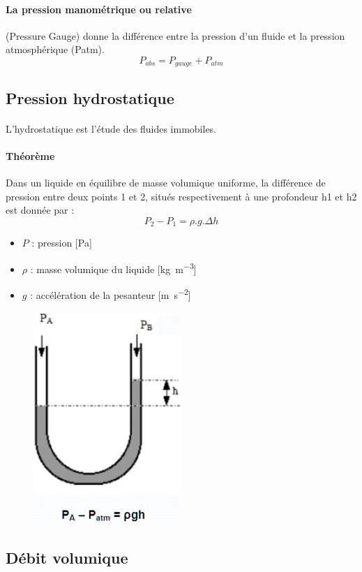 \documentclass{article}
\begin{document}
            \paragraph{La pression manométrique ou relative} (Pressure Gauge) donne la différence entre la pression d'un fluide et la pression atmosphérique (Patm).
            $$P_{abs} = P_{gauge} + P_{atm}$$

            \subsection{Pression hydrostatique}
            \paragraph{}
            L'hydrostatique est l'étude des fluides immobiles.

            \paragraph{Théorème}
            Dans un liquide en équilibre de masse volumique uniforme, la différence de pression entre deux points 1 et 2, situés respectivement à une profondeur h1 et h2 est donnée par : $$P_2 - P_1 = \rho.g.\Delta h$$

            \begin{itemize}
                \item $P$ : pression [\si{\pascal}]
                \item $\rho$ : masse volumique du liquide [\si{\kilogram \per \meter^{3}}]
                \item $g$ : accélération de la pesanteur [\si{\meter \per \second^{2}}]
            \end{itemize}
            
            \begin{figure}[H]
            \centering
                \includegraphics[width=0.2\linewidth]{./images/014-hydrostatique.png}
            \end{figure}

        \subsection{Débit volumique}
\end{document}
